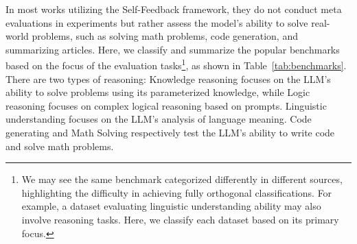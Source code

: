 \documentclass[lettersize,journal]{IEEEtran}
\begin{document}
\noindent In most works utilizing the Self-Feedback framework, they do not conduct meta evaluations in experiments but rather assess the model's ability to solve real-world problems, such as solving math problems, code generation, and summarizing articles. Here, we classify and summarize the popular benchmarks based on the focus of the evaluation tasks\footnote{We may see the same benchmark categorized differently in different sources, highlighting the difficulty in achieving fully orthogonal classifications. For example, a dataset evaluating linguistic understanding ability may also involve reasoning tasks. Here, we classify each dataset based on its primary focus.}, as shown in Table~\ref{tab:benchmarks}. There are two types of reasoning: Knowledge reasoning focuses on the LLM's ability to solve problems using its parameterized knowledge, while Logic reasoning focuses on complex logical reasoning based on prompts. Linguistic understanding focuses on the LLM's analysis of language meaning. Code generating and Math Solving respectively test the LLM's ability to write code and solve math problems.
\end{document}
